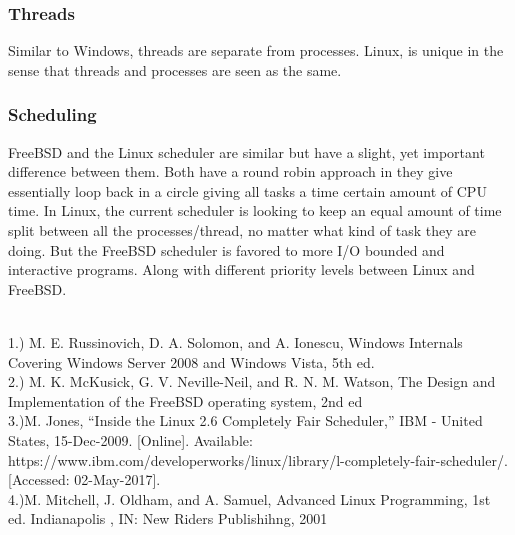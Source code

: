 \documentclass[10pt,conference,draftclsnofoot,onecolumn]{IEEEtran}
\begin{document}
        \subsubsection{Threads}
            Similar to Windows, threads are separate from processes. Linux, is unique in the sense that threads and processes are seen as the same. \\
        \subsubsection{Scheduling}
                FreeBSD and the Linux scheduler are similar but have a slight, yet important difference between them. Both have a round robin approach in they give essentially loop back in a circle giving all tasks a time certain amount of CPU time. In Linux, the current scheduler is looking to keep an equal amount of time split between all the processes/thread, no matter what kind of task they are doing. But the FreeBSD scheduler is favored to more I/O bounded and interactive programs. Along with different priority levels between Linux and FreeBSD. 
\newpage
\begin{citation}
\\
1.) M. E. Russinovich, D. A. Solomon, and A. Ionescu, Windows Internals Covering Windows Server 2008 and Windows Vista, 5th ed.\\ 
2.) M. K. McKusick, G. V. Neville-Neil, and R. N. M. Watson, The Design and Implementation of the FreeBSD operating system, 2nd ed\\
3.)M. Jones, “Inside the Linux 2.6 Completely Fair Scheduler,” IBM - United States, 15-Dec-2009. [Online]. Available: https://www.ibm.com/developerworks/linux/library/l-completely-fair-scheduler/. [Accessed: 02-May-2017]. \\
4.)M. Mitchell, J. Oldham, and A. Samuel, Advanced Linux Programming, 1st ed. Indianapolis , IN: New Riders Publishihng, 2001
\end{citation}    
\end{document}
